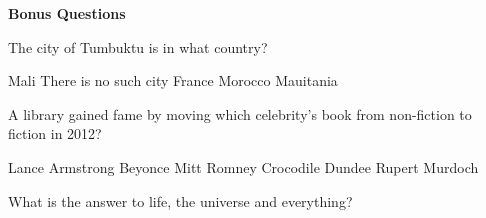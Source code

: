 \documentclass[10pt,answers,addpoints]{exam}
\begin{document}
\begin{questions}



\newpage
\begin{center}
{\Large \textbf{Bonus Questions}}
\end{center}

\par\vspace{0.100000in}\begin{minipage}{\linewidth}
\bonusquestion[2]
The city of Tumbuktu is in what country?
\medskip
\begin{choices}
\choice Mali
\choice There is no such city
\choice France
\choice Morocco
\choice Mauitania
\end{choices}
\setlength\answerlinelength{1in}
\answerline[A]

\end{minipage}


\par\vspace{0.100000in}\begin{minipage}{\linewidth}
\bonusquestion[2]
A library gained fame by moving which celebrity's book from non-fiction to fiction in 2012?
\medskip
\begin{choices}
\choice Lance Armstrong
\choice Beyonce
\choice Mitt Romney
\choice Crocodile Dundee
\choice Rupert Murdoch
\end{choices}
\setlength\answerlinelength{1in}
\answerline[A]

\end{minipage}


\par\vspace{0.100000in}\begin{minipage}{\linewidth}
\vspace{.35cm}\bonusquestion[2]
What is the answer to life, the universe and everything?
\vspace{.25cm}\setlength\answerlinelength{3in}
\answerline[42]
\end{minipage}





\end{questions}
\end{document}
